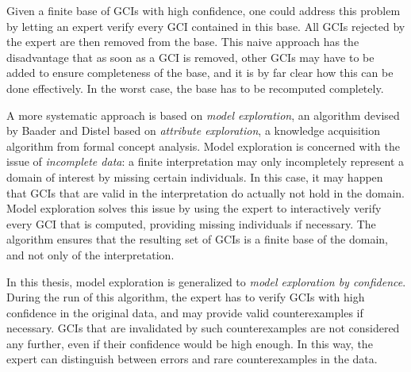 \documentclass[english,fleqn]{scrartcl}
\begin{document}
Given a finite base of GCIs with high confidence, one could address this problem by
letting an expert verify every GCI contained in this base.  All GCIs rejected by the
expert are then removed from the base.  This naive approach has the disadvantage that as
soon as a GCI is removed, other GCIs may have to be added to ensure completeness of the
base, and it is by far clear how this can be done effectively.  In the worst case, the
base has to be recomputed completely.

A more systematic approach is based on \emph{model exploration}, an algorithm devised by
Baader and Distel based on \emph{attribute exploration}, a knowledge acquisition algorithm
from formal concept analysis.  Model exploration is concerned with the issue of
\emph{incomplete data}: a finite interpretation may only incompletely represent a domain
of interest by missing certain individuals.  In this case, it may happen that GCIs that
are valid in the interpretation do actually not hold in the domain.  Model exploration
solves this issue by using the expert to interactively verify every GCI that is computed,
providing missing individuals if necessary.  The algorithm ensures that the resulting set
of GCIs is a finite base of the domain, and not only of the interpretation.

In this thesis, model exploration is generalized to \emph{model exploration by
  confidence}.  During the run of this algorithm, the expert has to verify GCIs with high
confidence in the original data, and may provide valid counterexamples if necessary.  GCIs
that are invalidated by such counterexamples are not considered any further, even if their
confidence would be high enough.  In this way, the expert can distinguish between errors
and rare counterexamples in the data.

\printbibliography{}
\end{document}
